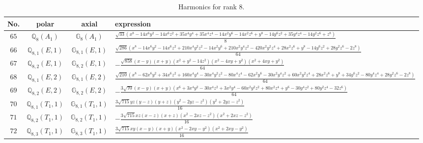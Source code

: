 \documentclass[fleqn,8pt,landscape]{jsarticle}
\begin{document}
\begin{table}[ht!]
\begin{center}
\caption{Harmonics for rank 8.}
\renewcommand{\arraystretch}{1.3}
\begin{tabular}{cccl} \hline \hline
No. & polar & axial & expression \\ \hline
$ 65 $ & $ \mathbb{Q}_{8}(A_{1}) $ & $ \mathbb{G}_{8}(A_{1}) $ & $ \frac{\sqrt{33} \left(x^{8} - 14 x^{6} y^{2} - 14 x^{6} z^{2} + 35 x^{4} y^{4} + 35 x^{4} z^{4} - 14 x^{2} y^{6} - 14 x^{2} z^{6} + y^{8} - 14 y^{6} z^{2} + 35 y^{4} z^{4} - 14 y^{2} z^{6} + z^{8}\right)}{8} $ \\
$ 66 $ & $ \mathbb{Q}_{8,1}(E,1) $ & $ \mathbb{G}_{8,1}(E,1) $ & $ \frac{\sqrt{286} \left(x^{8} - 14 x^{6} y^{2} - 14 x^{6} z^{2} + 210 x^{4} y^{2} z^{2} - 14 x^{2} y^{6} + 210 x^{2} y^{4} z^{2} - 420 x^{2} y^{2} z^{4} + 28 x^{2} z^{6} + y^{8} - 14 y^{6} z^{2} + 28 y^{2} z^{6} - 2 z^{8}\right)}{64} $ \\
$ 67 $ & $ \mathbb{Q}_{8,2}(E,1) $ & $ \mathbb{G}_{8,2}(E,1) $ & $ - \frac{\sqrt{858} \left(x - y\right) \left(x + y\right) \left(x^{2} + y^{2} - 14 z^{2}\right) \left(x^{2} - 4 x y + y^{2}\right) \left(x^{2} + 4 x y + y^{2}\right)}{64} $ \\
$ 68 $ & $ \mathbb{Q}_{8,1}(E,2) $ & $ \mathbb{G}_{8,1}(E,2) $ & $ \frac{\sqrt{210} \left(x^{8} - 62 x^{6} y^{2} + 34 x^{6} z^{2} + 160 x^{4} y^{4} - 30 x^{4} y^{2} z^{2} - 80 x^{4} z^{4} - 62 x^{2} y^{6} - 30 x^{2} y^{4} z^{2} + 60 x^{2} y^{2} z^{4} + 28 x^{2} z^{6} + y^{8} + 34 y^{6} z^{2} - 80 y^{4} z^{4} + 28 y^{2} z^{6} - 2 z^{8}\right)}{64} $ \\
$ 69 $ & $ \mathbb{Q}_{8,2}(E,2) $ & $ \mathbb{G}_{8,2}(E,2) $ & $ - \frac{3 \sqrt{70} \left(x - y\right) \left(x + y\right) \left(x^{6} + 3 x^{4} y^{2} - 30 x^{4} z^{2} + 3 x^{2} y^{4} - 60 x^{2} y^{2} z^{2} + 80 x^{2} z^{4} + y^{6} - 30 y^{4} z^{2} + 80 y^{2} z^{4} - 32 z^{6}\right)}{64} $ \\
$ 70 $ & $ \mathbb{Q}_{8,1}(T_{1},1) $ & $ \mathbb{G}_{8,1}(T_{1},1) $ & $ \frac{3 \sqrt{715} y z \left(y - z\right) \left(y + z\right) \left(y^{2} - 2 y z - z^{2}\right) \left(y^{2} + 2 y z - z^{2}\right)}{16} $ \\
$ 71 $ & $ \mathbb{Q}_{8,2}(T_{1},1) $ & $ \mathbb{G}_{8,2}(T_{1},1) $ & $ - \frac{3 \sqrt{715} x z \left(x - z\right) \left(x + z\right) \left(x^{2} - 2 x z - z^{2}\right) \left(x^{2} + 2 x z - z^{2}\right)}{16} $ \\
$ 72 $ & $ \mathbb{Q}_{8,3}(T_{1},1) $ & $ \mathbb{G}_{8,3}(T_{1},1) $ & $ \frac{3 \sqrt{715} x y \left(x - y\right) \left(x + y\right) \left(x^{2} - 2 x y - y^{2}\right) \left(x^{2} + 2 x y - y^{2}\right)}{16} $ \\

\end{tabular}
\end{center}
\end{table}
\end{document}
